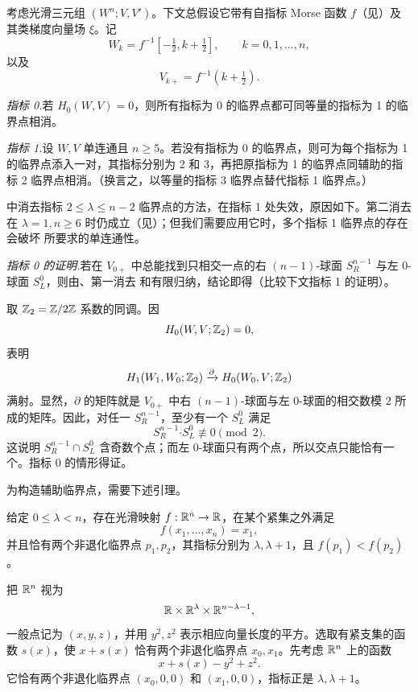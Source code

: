 
考虑光滑三元组 $(W^n;V,V')$。下文总假设它带有自指标 Morse 函数 $f$（见）及其类梯度向量场 $\xi$。记
\[
  W_k=f^{-1}[-\tfrac12,k+\tfrac12],
  \qquad k=0,1,\ldots,n,
\]
以及
\[
  V_{k+}=f^{-1}(k+\tfrac12).
\]


\noindent\textit{指标 0.}\quad 若 $H_0(W,V)=0$，则所有指标为 0 的临界点都可同等量的指标为 1 的临界点相消。

\noindent\textit{指标 1.}\quad 设 $W,V$ 单连通且 $n\geq5$。若没有指标为 0 的临界点，则可为每个指标为 1 的临界点添入一对，其指标分别为 2 和 3，再把原指标为 1 的临界点同辅助的指标 2 临界点相消。（换言之，以等量的指标 3 临界点替代指标 1 临界点。）

\Remark {} 中消去指标 $2\leq\lambda\leq n-2$ 临界点的方法，在指标 1 处失效，原因如下。第二消去 在 $\lambda=1,n\geq6$ 时仍成立（见）；但我们需要应用它时，多个指标 1 临界点的存在会破坏 所要求的单连通性。

\par\medskip\noindent\textit{指标 0 的证明.}\quad 若在 $V_{0+}$ 中总能找到只相交一点的右 $(n-1)$-球面 $S_R^{n-1}$ 与左 $0$-球面 $S_L^0$，则由、第一消去 和有限归纳，结论即得（比较下文指标 1 的证明）。

取 $\mathbb{Z}_2=\mathbb{Z}/2\mathbb{Z}$ 系数的同调。因
\[
  H_0(W,V;\mathbb{Z}_2)=0,
\]
 表明
\[
  H_1(W_1,W_0;\mathbb{Z}_2)
  \xrightarrow{\partial}
  H_0(W_0,V;\mathbb{Z}_2)
\]
满射。显然，$\partial$ 的矩阵就是 $V_{0+}$ 中右 $(n-1)$-球面与左 $0$-球面的相交数模 2 所成的矩阵。因此，对任一 $S_R^{n-1}$，至少有一个 $S_L^0$ 满足
\[
  S_R^{n-1}\mathbin{\boldsymbol\cdot}S_L^0
  \not\equiv0\pmod2.
\]
这说明 $S_R^{n-1}\cap S_L^0$ 含奇数个点；而左 $0$-球面只有两个点，所以交点只能恰有一个。指标 0 的情形得证。
\EndProof

为构造辅助临界点，需要下述引理。

给定 $0\leq\lambda<n$，存在光滑映射 $f:\mathbb{R}^n\to\mathbb{R}$，在某个紧集之外满足
\[
  f(x_1,\ldots,x_n)=x_1,
\]
并且恰有两个非退化临界点 $p_1,p_2$，其指标分别为 $\lambda,\lambda+1$，且 $f(p_1)<f(p_2)$。

\Proof 把 $\mathbb{R}^n$ 视为
\[
  \mathbb{R}\times\mathbb{R}^\lambda\times\mathbb{R}^{n-\lambda-1},
\]
一般点记为 $(x,y,z)$，并用 $y^2,z^2$ 表示相应向量长度的平方。选取有紧支集的函数 $s(x)$，使 $x+s(x)$ 恰有两个非退化临界点 $x_0,x_1$。先考虑 $\mathbb{R}^n$ 上的函数
\[
  x+s(x)-y^2+z^2.
\]
它恰有两个非退化临界点 $(x_0,0,0)$ 和 $(x_1,0,0)$，指标正是 $\lambda,\lambda+1$。

